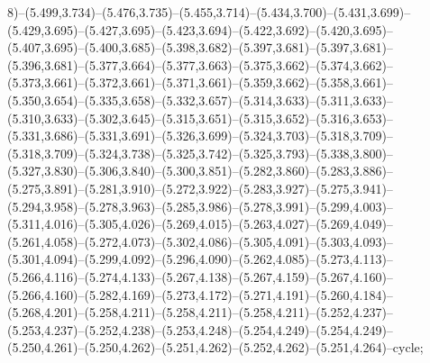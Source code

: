 8)--(5.499,3.734)--(5.476,3.735)--(5.455,3.714)--(5.434,3.700)--(5.431,3.699)--(5.429,3.695)--(5.427,3.695)--(5.423,3.694)--(5.422,3.692)--(5.420,3.695)--(5.407,3.695)--(5.400,3.685)--(5.398,3.682)--(5.397,3.681)--(5.397,3.681)--(5.396,3.681)--(5.377,3.664)--(5.377,3.663)--(5.375,3.662)--(5.374,3.662)--(5.373,3.661)--(5.372,3.661)--(5.371,3.661)--(5.359,3.662)--(5.358,3.661)--(5.350,3.654)--(5.335,3.658)--(5.332,3.657)--(5.314,3.633)--(5.311,3.633)--(5.310,3.633)--(5.302,3.645)--(5.315,3.651)--(5.315,3.652)--(5.316,3.653)--(5.331,3.686)--(5.331,3.691)--(5.326,3.699)--(5.324,3.703)--(5.318,3.709)--(5.318,3.709)--(5.324,3.738)--(5.325,3.742)--(5.325,3.793)--(5.338,3.800)--(5.327,3.830)--(5.306,3.840)--(5.300,3.851)--(5.282,3.860)--(5.283,3.886)--(5.275,3.891)--(5.281,3.910)--(5.272,3.922)--(5.283,3.927)--(5.275,3.941)--(5.294,3.958)--(5.278,3.963)--(5.285,3.986)--(5.278,3.991)--(5.299,4.003)--(5.311,4.016)--(5.305,4.026)--(5.269,4.015)--(5.263,4.027)--(5.269,4.049)--(5.261,4.058)--(5.272,4.073)--(5.302,4.086)--(5.305,4.091)--(5.303,4.093)--(5.301,4.094)--(5.299,4.092)--(5.296,4.090)--(5.262,4.085)--(5.273,4.113)--(5.266,4.116)--(5.274,4.133)--(5.267,4.138)--(5.267,4.159)--(5.267,4.160)--(5.266,4.160)--(5.282,4.169)--(5.273,4.172)--(5.271,4.191)--(5.260,4.184)--(5.268,4.201)--(5.258,4.211)--(5.258,4.211)--(5.258,4.211)--(5.252,4.237)--(5.253,4.237)--(5.252,4.238)--(5.253,4.248)--(5.254,4.249)--(5.254,4.249)--(5.250,4.261)--(5.250,4.262)--(5.251,4.262)--(5.252,4.262)--(5.251,4.264)--cycle;
